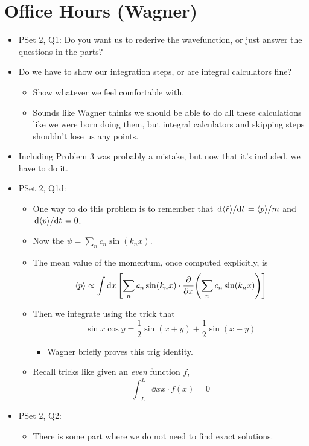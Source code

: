 \documentclass[../notes.tex]{subfiles}
\begin{document}
\section{Office Hours (Wagner)}
\begin{itemize}
    \item PSet 2, Q1: Do you want us to rederive the wavefunction, or just answer the questions in the parts?
    \item Do we have to show our integration steps, or are integral calculators fine?
    \begin{itemize}
        \item Show whatever we feel comfortable with.
        \item Sounds like Wagner thinks we should be able to do all these calculations like we were born doing them, but integral calculators and skipping steps shouldn't lose us any points.
    \end{itemize}
    \item Including Problem 3 was probably a mistake, but now that it's included, we have to do it.
    \item PSet 2, Q1d:
    \begin{itemize}
        \item One way to do this problem is to remember that $\dv*{\langle{\hat{r}}\rangle}{t}=\langle{p}\rangle/m$ and $\dv*{\langle{p}\rangle}{t}=0$.
        \item Now the $\psi=\sum_nc_n\sin(k_nx)$.
        \item The mean value of the momentum, once computed explicitly, is
        \begin{equation*}
            \langle{p}\rangle \propto \int\dd{x}\left[ \sum_nc_n\sin(k_nx)\cdot\pdv{x}(\sum_nc_n\sin(k_nx)) \right]
        \end{equation*}
        \item Then we integrate using the trick that
        \begin{equation*}
            \sin x\cos y = \frac{1}{2}\sin(x+y)+\frac{1}{2}\sin(x-y)
        \end{equation*}
        \begin{itemize}
            \item Wagner briefly proves this trig identity.
        \end{itemize}
        \item Recall tricks like given an \emph{even} function $f$,
        \begin{equation*}
            \int_{-L}^L\dd{x}x\cdot f(x) = 0
        \end{equation*}
    \end{itemize}
    \item PSet 2, Q2:
    \begin{itemize}
        \item There is some part where we do not need to find exact solutions.
    \end{itemize}
\end{itemize}
\end{document}
